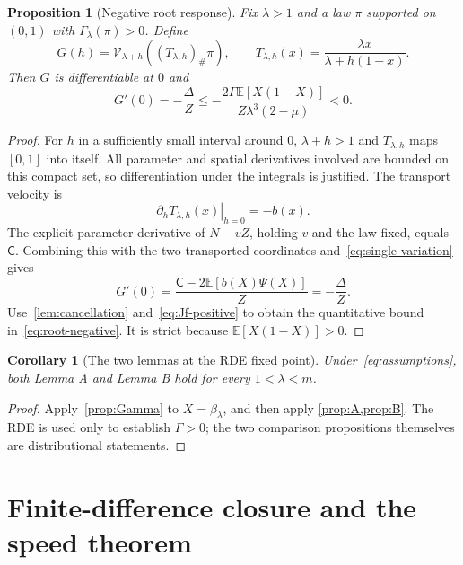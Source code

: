\documentclass[11pt,a4paper]{article}
\numberwithin{equation}{section}
\theoremstyle{plain}
\newtheorem{proposition}[proposition]{Proposition}
\newtheorem{corollary}[corollary]{Corollary}
\theoremstyle{definition}
\theoremstyle{remark}
\newcommand{\E}{\mathbb E}
\newcommand{\V}{\mathcal V}
\begin{document}
\begin{proposition}[Negative root response]\label{prop:B}
Fix $\lambda>1$ and a law $\pi$ supported on $(0,1)$ with
$\Gamma_\lambda(\pi)>0$.  Define
\begin{equation}
 G(h)=\V_{\lambda+h}((T_{\lambda,h})_\#\pi),\qquad
 T_{\lambda,h}(x)=\frac{\lambda x}{\lambda+h(1-x)}.
\end{equation}
Then $G$ is differentiable at $0$ and
\begin{equation}\label{eq:root-negative}
 G'(0)=-\frac\Delta Z
 \le-\frac{2\Gamma\E[X(1-X)]}{Z\lambda^3(2-\mu)}<0.
\end{equation}
\end{proposition}
\begin{proof}
For $h$ in a sufficiently small interval around $0$, $\lambda+h>1$ and
$T_{\lambda,h}$ maps $[0,1]$ into itself.  All parameter and spatial
derivatives involved are bounded on this compact set, so differentiation
under the integrals is justified.  The transport velocity is
\begin{equation}\label{eq:root-velocity}
 \left.\partial_hT_{\lambda,h}(x)\right|_{h=0}=-b(x).
\end{equation}
The explicit parameter derivative of $N-vZ$, holding $v$ and the law
fixed, equals $\mathsf C$.  Combining this with the two transported
coordinates and~\eqref{eq:single-variation} gives
\begin{equation}
 G'(0)=\frac{\mathsf C-2\E[b(X)\Psi(X)]}{Z}=-\frac\Delta Z.
\end{equation}
Use~\cref{lem:cancellation} and~\eqref{eq:Jf-positive} to obtain the
quantitative bound in~\eqref{eq:root-negative}.  It is strict because
$\E[X(1-X)]>0$.
\end{proof}

\begin{corollary}[The two lemmas at the RDE fixed point]\label{cor:AB}
Under~\eqref{eq:assumptions}, both Lemma A and Lemma B hold for every
$1<\lambda<m$.
\end{corollary}
\begin{proof}
Apply~\cref{prop:Gamma} to $X=\beta_\lambda$, and then apply
\cref{prop:A,prop:B}.  The RDE is used only to establish $\Gamma>0$;
the two comparison propositions themselves are distributional statements.
\end{proof}

\section{Finite-difference closure and the speed theorem}\label{sec:closure}
\end{document}
